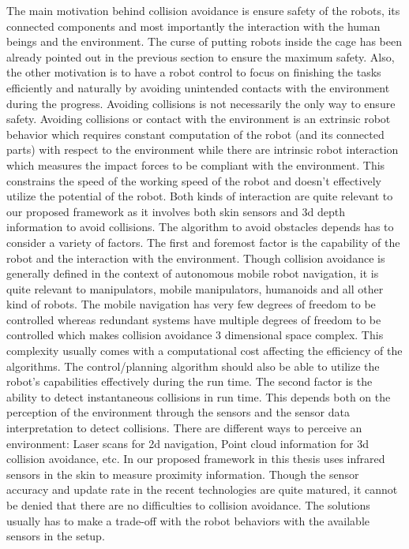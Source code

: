The main motivation behind collision avoidance is ensure safety of the robots, its connected components and most importantly the interaction with the human beings and the environment. The curse of putting robots inside the cage has been already pointed out in the previous section to ensure the maximum safety. Also, the other motivation is to have a robot control to focus on finishing the tasks efficiently and naturally by avoiding unintended contacts with the environment during the progress. Avoiding collisions is not necessarily the only way to ensure safety. Avoiding collisions or contact with the environment is an extrinsic robot behavior which requires constant computation of the robot (and its connected parts) with respect to the environment while there are intrinsic robot interaction which measures the impact forces to be compliant with the environment. This constrains the speed of the working speed of the robot and doesn't effectively utilize the potential of the robot. Both kinds of interaction are quite relevant to our proposed framework as it involves both skin sensors and 3d depth information to avoid collisions.
The algorithm to avoid obstacles depends has to consider a variety of factors. The first and foremost factor is the capability of the robot and the interaction with the environment. Though collision avoidance is generally defined in the context of autonomous mobile robot navigation, it is quite relevant to manipulators, mobile manipulators, humanoids and all other kind of robots. The mobile navigation has very few degrees of freedom to be controlled whereas redundant systems have multiple degrees of freedom to be controlled which makes collision avoidance 3 dimensional space complex. This complexity usually comes with a computational cost affecting the efficiency of the algorithms. The control/planning algorithm should also be able to utilize the robot's capabilities effectively during the run time. The second factor is the ability to detect instantaneous collisions in run time. This depends both on the perception of the environment through the sensors and the sensor data interpretation to detect collisions. There are different ways to perceive an environment: Laser scans for 2d navigation, Point cloud information for 3d collision avoidance, etc. In our proposed framework in this thesis uses infrared sensors in the skin to measure proximity information. Though the sensor accuracy and update rate in the recent technologies are quite matured, it cannot be denied that there are no difficulties to collision avoidance. The solutions usually has to make a trade-off with the robot behaviors with the available sensors in the setup. 
\label{sec:ca}

